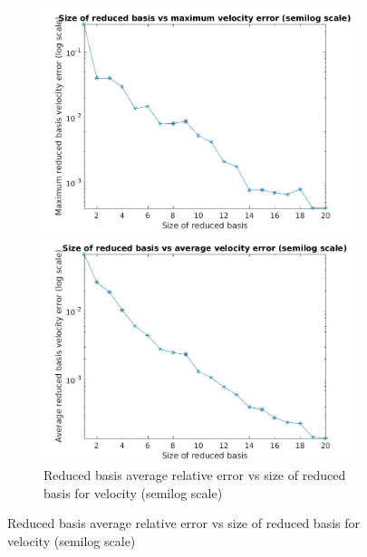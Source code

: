 \documentclass[a4paper,oneside,openright,spanish,english]{book}
\begin{document}
\begin{figure}
\begin{subfigure}{\textwidth}
  \includegraphics[width=\linewidth,height=0.45\textheight]{size_vs_maximum_reduced_basis_velocity_error_semilog.jpg}
  \caption{Reduced basis maximum relative error vs size of reduced basis for velocity (semilog scale)}
  \label{rb_max_velocity_error_vs_size} 
    \includegraphics[width=\linewidth,height=0.45\textheight]{size_vs_average_reduced_basis_velocity_error_semilog.jpg}
  \caption{Reduced basis average relative error vs size of reduced basis for velocity (semilog scale)}
  \label{rb_avg_velocity_error_vs_size} 
  \end{subfigure}
 \end{figure}
\end{document}
